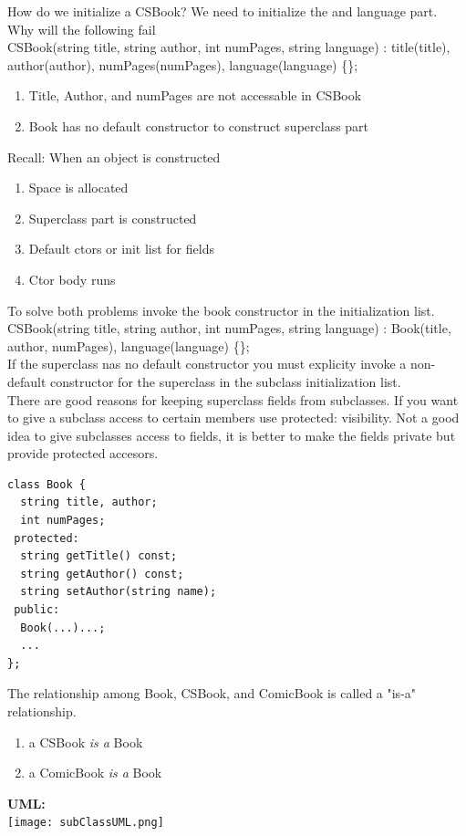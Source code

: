 \documentclass[english, 11pt]{article}
\begin{document}
How do we initialize a CSBook? We need to initialize the  and language part. Why will the following fail \\
{\ttfamily CSBook(string title, string author, int numPages, string language) : title(title), author(author), numPages(numPages), language(language) \{\};}
\begin{enumerate}
  \item Title, Author, and numPages are not accessable in CSBook
  \item Book has no default constructor to construct superclass part
\end{enumerate}
\begin{rem}
  Recall: When an object is constructed
  \begin{enumerate}
    \item Space is allocated
\item Superclass part is constructed
\item Default ctors or init list for fields
\item Ctor body runs
  \end{enumerate}
\end{rem}

To solve both problems invoke the book constructor in the initialization list. \\
{\ttfamily CSBook(string title, string author, int numPages, string language) : Book(title, author, numPages), language(language) \{\};} \\
If the superclass nas no default constructor you must explicity invoke a non-default constructor for the superclass in the subclass initialization list. \\
There are good reasons for keeping superclass fields from subclasses. If you want to give a subclass access to certain members use {\ttfamily protected:} visibility. Not a good idea to give subclasses access to fields, it is better to make the fields private but provide protected accesors.
\begin{lstlisting}
class Book {
  string title, author;
  int numPages;
 protected:
  string getTitle() const;
  string getAuthor() const;
  string setAuthor(string name);
 public:
  Book(...)...;
  ...
};
\end{lstlisting}
The relationship among Book, CSBook, and ComicBook is called a "is-a" relationship.
\begin{enumerate}
  \item a CSBook \textit{is a} Book
  \item a ComicBook \textit{is a} Book
\end{enumerate}
\textbf{UML:} \\
\texttt{[image: subClassUML.png]}
\end{document}
